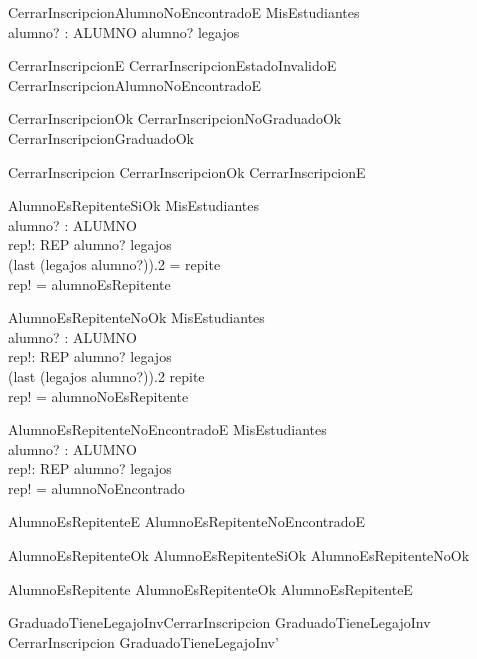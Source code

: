 \begin{schema}{CerrarInscripcionAlumnoNoEncontradoE}
    \Xi MisEstudiantes \\
    alumno? : ALUMNO
    \where
    alumno? \notin \dom legajos
\end{schema}

\begin{zed}
    CerrarInscripcionE  CerrarInscripcionEstadoInvalidoE \lor CerrarInscripcionAlumnoNoEncontradoE 
\end{zed}
\begin{zed}
    CerrarInscripcionOk  CerrarInscripcionNoGraduadoOk \lor CerrarInscripcionGraduadoOk
\end{zed}
\begin{zed}
    CerrarInscripcion  CerrarInscripcionOk \lor CerrarInscripcionE
\end{zed}

\begin{schema}{AlumnoEsRepitenteSiOk}
    \Xi MisEstudiantes \\
    alumno? : ALUMNO \\
    rep!: REP
    \where
    alumno? \in \dom legajos \\
    (last (legajos alumno?)).2 = repite \\
    rep! = alumnoEsRepitente
\end{schema}

\begin{schema}{AlumnoEsRepitenteNoOk}
    \Xi MisEstudiantes \\
    alumno? : ALUMNO \\
    rep!: REP
    \where
    alumno? \in \dom legajos \\
    (last (legajos alumno?)).2 \neq repite \\
    rep! = alumnoNoEsRepitente
\end{schema}

\begin{schema}{AlumnoEsRepitenteNoEncontradoE}
    \Xi MisEstudiantes \\
    alumno? : ALUMNO \\
    rep!: REP
    \where
    alumno? \notin \dom legajos \\
    rep! = alumnoNoEncontrado
\end{schema}

\begin{zed}
    AlumnoEsRepitenteE  AlumnoEsRepitenteNoEncontradoE 
\end{zed}
\begin{zed}
    AlumnoEsRepitenteOk  AlumnoEsRepitenteSiOk \lor AlumnoEsRepitenteNoOk 
\end{zed}
\begin{zed}
    AlumnoEsRepitente  AlumnoEsRepitenteOk \lor AlumnoEsRepitenteE
\end{zed}

\begin{theorem}{GraduadoTieneLegajoInvCerrarInscripcion}
    GraduadoTieneLegajoInv \land CerrarInscripcion \implies GraduadoTieneLegajoInv'
\end{theorem}

